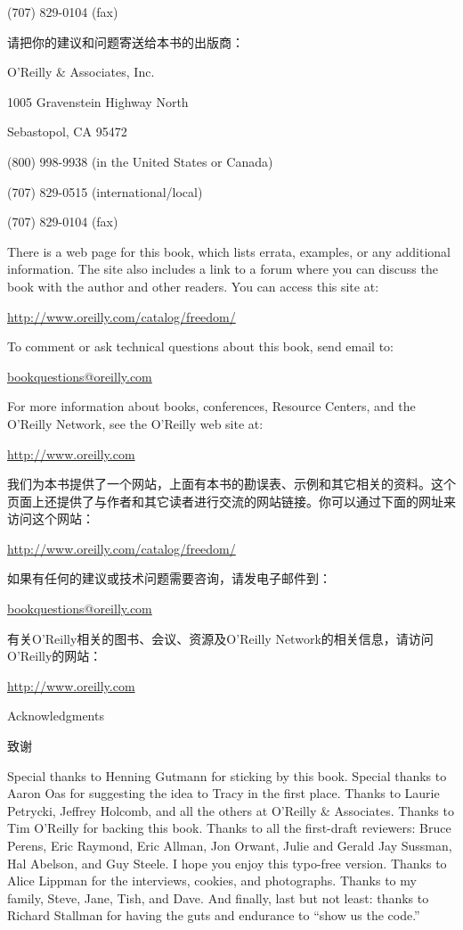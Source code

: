 (707) 829-0104 (fax)
\fi

\ifdefined\chs
请把你的建议和问题寄送给本书的出版商：

O'Reilly \& Associates, Inc. 

1005 Gravenstein Highway North 

Sebastopol, CA 95472 

(800) 998-9938 (in the United States or Canada) 

(707) 829-0515 (international/local) 

(707) 829-0104 (fax)
\fi

\ifdefined\eng
There is a web page for this book, which lists errata, examples, or any additional information. The site also includes a link to a forum where you can discuss the book with the author and other readers. You can access this site at:

\url{http://www.oreilly.com/catalog/freedom/}

To comment or ask technical questions about this book, send email to:

\url{bookquestions@oreilly.com}

For more information about books, conferences, Resource Centers, and the O'Reilly Network, see the O'Reilly web site at:

\url{http://www.oreilly.com}
\fi

\ifdefined\chs
我们为本书提供了一个网站，上面有本书的勘误表、示例和其它相关的资料。这个页面上还提供了与作者和其它读者进行交流的网站链接。你可以通过下面的网址来访问这个网站：

\url{http://www.oreilly.com/catalog/freedom/}

如果有任何的建议或技术问题需要咨询，请发电子邮件到：

\url{bookquestions@oreilly.com}

有关O'Reilly相关的图书、会议、资源及O'Reilly Network的相关信息，请访问O'Reilly的网站：

\url{http://www.oreilly.com}
\fi

\ifdefined\eng
Acknowledgments
\fi

\ifdefined\chs
致谢
\fi

\ifdefined\eng
Special thanks to Henning Gutmann for sticking by this book. Special thanks to Aaron Oas for suggesting the idea to Tracy in the first place. Thanks to Laurie Petrycki, Jeffrey Holcomb, and all the others at O'Reilly \& Associates. Thanks to Tim O'Reilly for backing this book. Thanks to all the first-draft reviewers: Bruce Perens, Eric Raymond, Eric Allman, Jon Orwant, Julie and Gerald Jay Sussman, Hal Abelson, and Guy Steele. I hope you enjoy this typo-free version. Thanks to Alice Lippman for the interviews, cookies, and photographs. Thanks to my family, Steve, Jane, Tish, and Dave. And finally, last but not least: thanks to Richard Stallman for having the guts and endurance to ``show us the code.''
\fi

